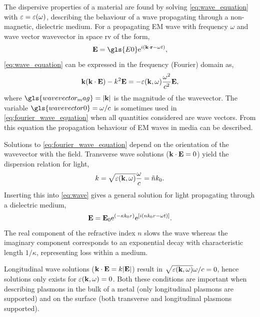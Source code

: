 \documentclass{article}
\begin{document}
The dispersive properties of a material are found by solving \eqref{eq:wave_equation} with $\varepsilon=\varepsilon(\omega)$, describing the behaviour of a wave propagating through a non-magnetic, dielectric medium. For a propagating EM wave with frequency $\omega$ and wave vector \gls{wavevector} in space \gls{rv} of the form,
\begin{equation}
	\vec{E} = \gls{E0} \e^{i(\wv \cdot \vec{r} - \omega t)},
	\label{eq:wave}
\end{equation}
\eqref{eq:wave_equation} can be expressed in the frequency (Fourier) domain as,
\begin{equation}
	\mathbf{k}(\mathbf{k}\cdot\mathbf{E}) - k^2\mathbf{E} = -\varepsilon(\mathbf{k}, \omega) \frac{\omega^2}{c^2}\mathbf{E},
	\label{eq:fourier_wave_equation}
\end{equation}
where $\gls{wavevector_mag}=|\wv|$ is the magnitude of the wavevector. The variable $\gls{wavevector0} = \omega/c$ is sometimes used in \eqref{eq:fourier_wave_equation} when all quantities considered are wave vectors. From this equation the propagation behaviour of EM waves in media can be described.

Solutions to \eqref{eq:fourier_wave_equation} depend on the orientation of the wavevector with the field. Transverse wave solutions ($\mathbf{k}\cdot\mathbf{E}=0$) yield the dispersion relation for light,
\begin{equation}
	k = \sqrt{\varepsilon(\mathbf{k}, \omega)}\frac{\omega}{c}=\tilde{n}k_0.
	\label{eq:light_dispersion}
\end{equation}
Inserting this into \eqref{eq:wave} gives a general solution for light propagating through a dielectric medium,
\begin{equation}
	\mathbf{E} = \mathbf{E}_0 \mathrm{e}^{\left({-\kappa k_0 r}\right)} \mathrm{e}^{\left[{i\left(n k_0 r - \omega t\right)}\right]}.
	\label{eq:gen_wave_solution}
\end{equation}
The real component of the refractive index $n$ slows the wave whereas the imaginary component corresponds to an exponential decay with characteristic length $1/\kappa$, representing loss within a medium.

Longitudinal wave solutions ($\mathbf{k}\cdot\mathbf{E} = k|\mathbf{E}|$) result in $\sqrt{\varepsilon(\mathbf{k},\omega)}\omega/c = 0$, hence solutions only exists for $\varepsilon(\mathbf{k}, \omega)=0$. Both these conditions are important when describing plasmons in the bulk of a metal (only longitudinal plasmons are supported) and on the surface (both transverse and longitudinal plasmons supported).
\end{document}
